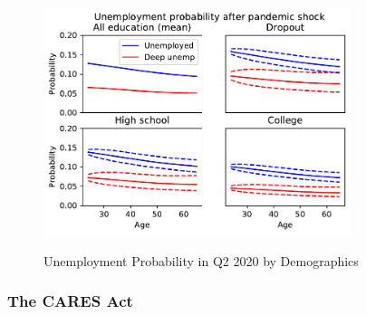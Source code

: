 \documentclass[titlepage,a4paper]{\econtex}
\begin{document}
\begin{figure}
  \centering
  \caption{Unemployment Probability in Q2 2020 by Demographics}
  \label{unemployment_demographics}
  { \includegraphics[width=0.8\textwidth]{./Figures/UnempProbByDemogBasic}}
\end{figure}


\subsubsection{The CARES Act}
\end{document}
